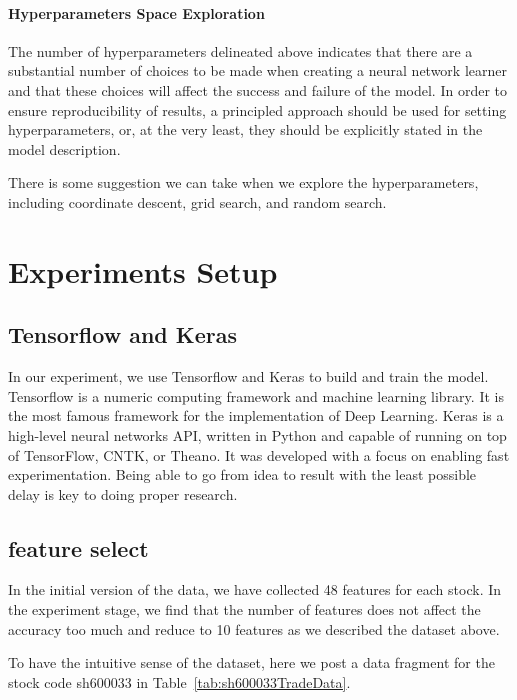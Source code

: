 \documentclass{article}
\begin{document}
\paragraph{Hyperparameters Space Exploration}
The number of hyperparameters delineated above indicates that there are a substantial number of choices to be made when creating a neural network learner and that these choices will affect the success and failure of the model. In order to ensure reproducibility of results, a principled approach should be used for setting hyperparameters, or, at the very least, they should be explicitly stated in the model description.

There is some suggestion we can take when we explore the hyperparameters, including coordinate descent, grid search, and random search.
%
\section{Experiments Setup}
\label{sec:Experiments Setup}
\subsection{Tensorflow and Keras}
In our experiment, we use Tensorflow and Keras to build and train the model. Tensorflow is a numeric computing framework and machine learning library. It is the most famous framework for the implementation of Deep Learning. Keras is a high-level neural networks API, written in Python and capable of running on top of TensorFlow, CNTK, or Theano. It was developed with a focus on enabling fast experimentation.  Being able to go from idea to result with the least possible delay is key to doing proper research.

\subsection{feature select}
In the initial version of the data, we have collected 48 features for each stock. In the experiment stage, we find that the number of features does not affect the accuracy too much and reduce to 10 features as we described the dataset above.

To have the intuitive sense of the dataset, here we post a data fragment for the stock code sh600033 in Table~\ref{tab:sh600033TradeData}.
\end{document}
